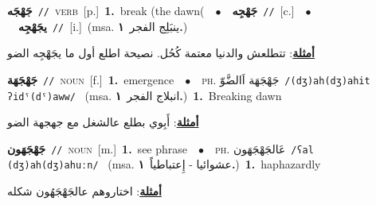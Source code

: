 \documentclass[10pt,a4paper,twoside]{article} %
\begin{document}
\begin{multicols}{2}
{\setlength\topsep{0pt}\textbf{\foreignlanguage{arabic}{جَهْجَه}}\ {\color{gray}\texttt{//}\color{black}}\ \textsc{verb}\ [p.]\ \textbf{1.}~break (the dawn(\ \ $\bullet$\ \ \setlength\topsep{0pt}\textbf{\foreignlanguage{arabic}{جَهْجِه}}\ {\color{gray}\texttt{//}\color{black}}\ [c.]\ \ $\bullet$\ \ \setlength\topsep{0pt}\textbf{\foreignlanguage{arabic}{يجَهْجِه}}\ {\color{gray}\texttt{//}\color{black}}\ [i.]\ \color{gray}(msa. \foreignlanguage{arabic}{ينبَلِج الفجر}~\foreignlanguage{arabic}{\textbf{١.}})\color{black}\  \begin{flushright}\color{gray}\foreignlanguage{arabic}{\textbf{\underline{\foreignlanguage{arabic}{أمثلة}}}: تتطلعش والدنيا معتمة كُحُل. نصيحة اطلع أول ما يجَهْجِه الضو}\end{flushright}\color{black}} \vspace{2mm}

{\setlength\topsep{0pt}\textbf{\foreignlanguage{arabic}{جَهْجَهَة}}\ {\color{gray}\texttt{//}\color{black}}\ \textsc{noun}\ [f.]\ \textbf{1.}~emergence\ \ $\bullet$\ \ \textsc{ph.} \color{gray} \foreignlanguage{arabic}{جَهْجَهَة اَالضَّوّ}\color{black}\ {\color{gray}\texttt{/{\sffamily (dʒ)ah(dʒ)ahit ʔidˤ(dˤ)aww}/}\color{black}}\ \color{gray} (msa. \foreignlanguage{arabic}{انبلاج الفجر}~\foreignlanguage{arabic}{\textbf{١.}})\color{black}\ \textbf{1.}~Breaking dawn\  \begin{flushright}\color{gray}\foreignlanguage{arabic}{\textbf{\underline{\foreignlanguage{arabic}{أمثلة}}}: أَبِوي بطلع عالشغل مع جهجهة الضو}\end{flushright}\color{black}} \vspace{2mm}

{\setlength\topsep{0pt}\textbf{\foreignlanguage{arabic}{جَهْجَهَون}}\ {\color{gray}\texttt{//}\color{black}}\ \textsc{noun}\ [m.]\ \textbf{1.}~see phrase\ \ $\bullet$\ \ \textsc{ph.} \color{gray} \foreignlanguage{arabic}{عَالجَهْجَهَون}\color{black}\ {\color{gray}\texttt{/{\sffamily ʕal (dʒ)ah(dʒ)ahuːn}/}\color{black}}\ \color{gray} (msa. \foreignlanguage{arabic}{عشوائيا - إِعتباطياً}~\foreignlanguage{arabic}{\textbf{١.}})\color{black}\ \textbf{1.}~haphazardly\  \begin{flushright}\color{gray}\foreignlanguage{arabic}{\textbf{\underline{\foreignlanguage{arabic}{أمثلة}}}: اختاروهم عالجَهْجَهُون شكله}\end{flushright}\color{black}} \vspace{2mm}


\end{multicols}
\end{document}
